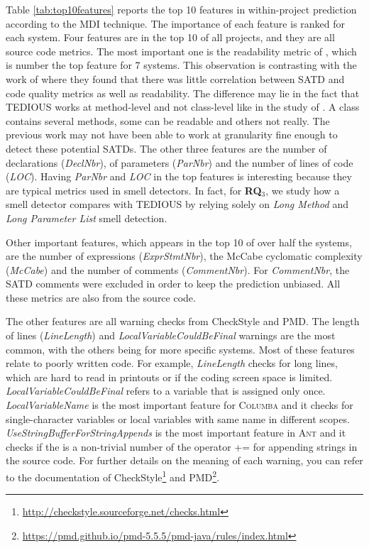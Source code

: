 Table \ref{tab:top10features} reports the top 10 features in within-project prediction according to the MDI technique. The importance of each feature is ranked for each system. Four features are in the top 10 of all projects, and they are all source code metrics. The most important one is the readability metric of \citet{buse2008metric}, which is number the top feature for 7 systems. This observation is contrasting with the work of \citet{BavotaR16} where they found that there was little correlation between SATD and code quality metrics as well as readability. The difference may lie in the fact that TEDIOUS works at method-level and not class-level like in the study of \citet{BavotaR16}. A class contains several methods, some can be readable and others not really. The previous work may not have been able to work at granularity fine enough to detect these potential SATDs. The other three features are the number of declarations (\textit{DeclNbr}), of parameters (\textit{ParNbr}) and the number of lines of code (\textit{LOC}). Having \textit{ParNbr} and \textit{LOC} in the top features is interesting because they are typical metrics used in smell detectors. In fact, for \textbf{RQ$_3$}, we study how a smell detector compares with TEDIOUS by relying solely on \textit{Long Method} and \textit{Long Parameter List} smell detection.
	
Other important features, which appears in the top 10 of over half the systems, are the number of expressions (\textit{ExprStmtNbr}), the McCabe cyclomatic complexity (\textit{McCabe}) and the number of comments (\textit{CommentNbr}). For \textit{CommentNbr}, the SATD comments were excluded in order to keep the prediction unbiased. All these metrics are also from the source code.

The other features are all warning checks from CheckStyle and PMD. The length of lines (\textit{LineLength}) and \textit{LocalVariableCouldBeFinal} warnings are the most common, with the others being for more specific systems. Most of these features relate to poorly written code. For example, \textit{LineLength} checks for long lines, which are hard to read in printouts or if the coding screen space is limited. \textit{LocalVariableCouldBeFinal} refers to a variable that is assigned only once. \textit{LocalVariableName} is the most important feature for \textsc{Columba} and it checks for single-character variables or local variables with same name in different scopes. \textit{UseStringBufferForStringAppends} is the most important feature in \textsc{Ant} and it checks if the is a non-trivial number of the operator \textsc{+=} for appending strings in the source code. For further details on the meaning of each warning, you can refer to the documentation of CheckStyle\footnote{\url{http://checkstyle.sourceforge.net/checks.html}} and PMD\footnote{\url{https://pmd.github.io/pmd-5.5.5/pmd-java/rules/index.html}}.

